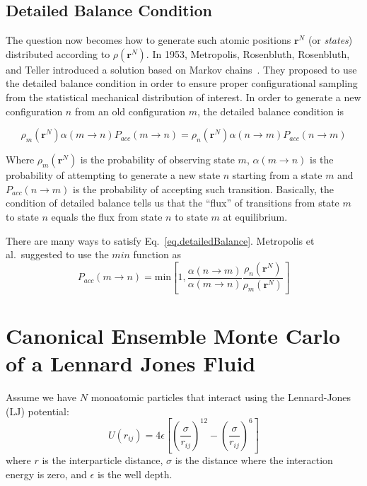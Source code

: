\documentclass[aip,jcp,preprint,superscriptaddress,floatfix]{revtex4-1}
\begin{document}
\subsection{Detailed Balance Condition}

The question now becomes how to generate such atomic positions $\textbf{r}^N$
(or \textit{states}) distributed
according to $\rho\left(\textbf{r}^N\right)$. In 1953, Metropolis, Rosenbluth, Rosenbluth, and Teller introduced a
solution based on Markov chains~\cite{Metropolis.JCP.21.1087.1953}. 
They proposed to use the detailed balance
condition in order to ensure proper configurational sampling from
the statistical mechanical distribution of interest. In order to generate
a new configuration $n$ from an old configuration $m$,
the detailed balance condition is

\begin{equation}
	\rho_m\left(\textbf{r}^N\right) \alpha \left(m \rightarrow n \right)
	P_{acc} \left(m \rightarrow n \right) =
	\rho_n\left(\textbf{r}^N\right) \alpha \left(n \rightarrow m \right)
	P_{acc} \left(n \rightarrow m \right) 
	   \label{eq.detailedBalance}
\end{equation}

Where $\rho_m\left(\textbf{r}^N\right)$ is the probability of observing
state $m$,
$\alpha \left(m \rightarrow n \right)$ is the probability of
attempting to generate a new state $n$ starting from a state $m$  and 
$P_{acc} \left(n \rightarrow m \right)$ is the probability of accepting 
such transition. Basically, the condition of detailed balance tells us that the
``flux'' of transitions
from state $m$ to state $n$ equals the flux from state $n$ to state $m$ at
equilibrium.

There are many ways to satisfy Eq.~\ref{eq.detailedBalance}. 
Metropolis et al.\ suggested to use the $min$ function as
\begin{equation}
	P_{acc}(m \rightarrow n) = \text{min} \left[1,\frac{\alpha \left(n
		\rightarrow m \right)}{\alpha \left(m \rightarrow n \right)}
		\frac{\rho_n\left(\textbf{r}^N\right)}{\rho_m\left(\textbf{r}^N\right)}
	\right]
	\label{eq.detailedBalanceFinal}
\end{equation}

\section{Canonical Ensemble Monte Carlo of a Lennard Jones Fluid}

Assume we have $N$ monoatomic particles that interact using the Lennard-Jones (LJ) potential:
\begin{equation}
U\left(r_{ij} \right) = 4 \epsilon \left[\left(\frac{\sigma}{r_{ij}}\right)^{12} -\left(\frac{\sigma}{r_{ij}}\right)^{6} \right]
\end{equation}
where $r$ is the interparticle distance, $\sigma$ is the distance where the interaction energy is zero, and $\epsilon$ is the well depth. 
\end{document}
